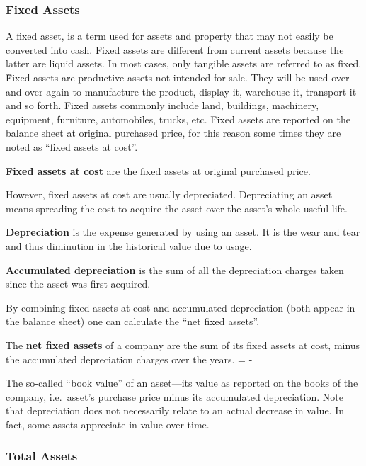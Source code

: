 \subsubsection{Fixed Assets}

A fixed asset, is a term used for assets and property that may not easily be converted into cash. Fixed assets are
different from current assets because the latter are liquid assets. In most cases, only tangible assets are referred to
as fixed. \v

Fixed assets are productive assets not intended for sale. They will be used over and over again to manufacture the
product, display it, warehouse it, transport it and so forth. Fixed assets commonly include land, buildings,
machinery, equipment, furniture, automobiles, trucks, etc. Fixed assets are reported on the balance sheet at original
purchased price, for this reason some times they are noted as ``fixed assets at cost''.

\textbf{Fixed assets at cost} are the fixed assets at original purchased price.
\ed

However, fixed assets at cost are usually depreciated. Depreciating an asset means spreading the cost to acquire the
asset over the asset's whole useful life.

\bd[Depreciation]
\textbf{Depreciation} is the expense generated by using an asset. It is the wear and tear and thus diminution in the
historical value due to usage.
\ed

\textbf{Accumulated depreciation} is the sum of all the depreciation charges taken since the asset was first acquired.
\ed

By combining fixed assets at cost and accumulated depreciation (both appear in the balance sheet) one can calculate
the ``net fixed assets''.

The \textbf{net fixed assets} of a company are the sum of its fixed assets at cost, minus the accumulated depreciation
charges over the years.
\bse
{} =  - 
\ese
\ed

The so-called ``book value'' of an asset—its value as reported on the books of the company, i.e.\ asset's purchase
price minus its accumulated depreciation. Note that depreciation does not necessarily relate to an actual decrease
in value. In fact, some assets appreciate in value over time.

\subsubsection{Total Assets}

